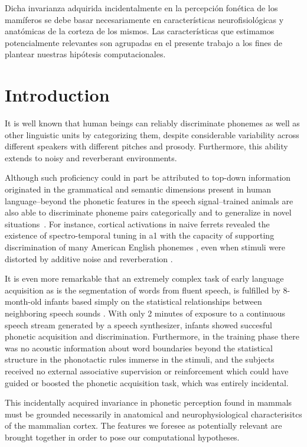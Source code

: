 {Dicha invarianza adquirida incidentalmente en la percepción fonética de los mamíferos se debe basar necesariamente en características neurofisiológicas y anatómicas de la corteza de los mismos. Las características que estimamos potencialmente relevantes son agrupadas en el presente trabajo a los fines de plantear nuestras hipótesis computacionales.
}{
\section{Introduction}

It is well known that human beings can reliably discriminate phonemes as well as other linguistic units by categorizing them, despite considerable variability across different speakers with different pitches and prosody. Furthermore, this ability extends to noisy and reverberant environments.

Although such proficiency could in part be attributed to top-down information \cite{PMID:17451657} originated in the grammatical and semantic \cite{OBLESER2011713,10.1093/cercor/bhp128} dimensions present in human language--beyond the phonetic features in the speech signal--trained animals are also able to discriminate phoneme pairs categorically and to generalize in novel situations~\cite{kuhl_1975, kuhl_1983, kluender_1998, pons_2006, hienz_1996, dent_1997, lotto_1997}. For instance, cortical activations in naive ferrets revealed the existence of spectro-temporal tuning in \gls{a1} with the capacity of supporting discrimination of many American English phonemes \cite{mesgarani_2008}, even when stimuli were distorted by additive noise and reverberation \cite{mesgarani_2014A}.

It is even more remarkable that an extremely complex task of early language acquisition as is the segmentation of words from fluent speech, is fulfilled by 8-month-old infants based simply on the statistical relationships between neighboring speech sounds \cite{Saffran1996StatisticalLB}. With only 2 minutes of exposure to a continuous speech stream generated by a speech synthesizer, infants showed succesful phonetic acquisition and discrimination. Furthermore, in the training phase there was no acoustic information about word boundaries beyond the statistical structure in the phonotactic rules immerse in the stimuli, and the subjects received no external associative supervision or reinforcement which could have guided or boosted the phonetic acquisition task, which was entirely incidental.

This incidentally acquired invariance in phonetic perception found in mammals must be grounded necessarily in anatomical and neurophysiological characterisitcs of the mammalian cortex. The features we foresee as potentially relevant are brought together in order to pose our computational hypotheses.
}















